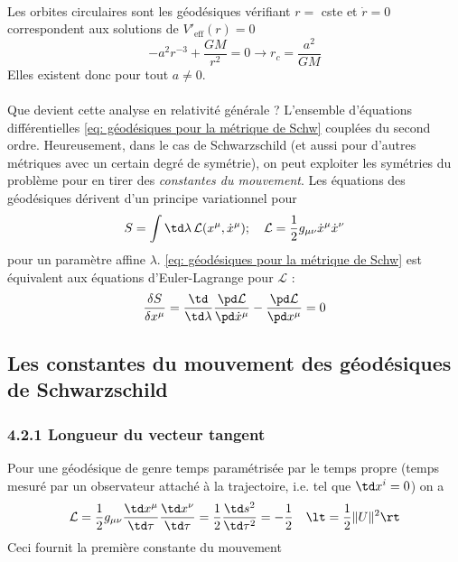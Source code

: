 \\
Les orbites circulaires sont les géodésiques vérifiant $r = $ cste et $\dot{r} = 0$ correspondent aux solutions de $V'_\text{eff}(r) = 0$
\begin{equation}
    - a^2 r^{-3} + \frac{GM}{r^2} = 0 \to r_c = \frac{a^2}{GM}
\end{equation}
Elles existent donc pour tout $a\neq 0$.\\
\\
Que devient cette analyse en relativité générale ? L'ensemble d'équations différentielles \ref{eq: géodésiques pour la métrique de Schw} couplées du second ordre. Heureusement, dans le cas de Schwarzschild (et aussi pour d'autres métriques avec un certain degré de symétrie), on peut exploiter les symétries du problème pour en tirer des \emph{constantes du mouvement}. Les équations des géodésiques dérivent d'un principe variationnel pour
\begin{equation}
    S = \int \td \lambda \, \mathcal{L}(x^\mu,\dot{x}^\mu); \quad \mathcal{L} = \frac{1}{2} g_{\mu\nu} \dot{x}^\mu \dot{x}^\nu
\end{equation}
pour un paramètre affine $\lambda$. \ref{eq: géodésiques pour la métrique de Schw} est équivalent aux équations d'Euler-Lagrange pour $\mathcal{L}$ :
\begin{equation}
    \frac{\delta S}{\delta x^\mu} = \frac{\td}{\td \lambda} \frac{\pd \mathcal{L}}{\pd \dot{x}^\mu} - \frac{\pd \mathcal{L}}{\pd x^\mu} = 0
\end{equation}
\subsection{Les constantes du mouvement des géodésiques de Schwarzschild}
\subsubsection{4.2.1 Longueur du vecteur tangent}
Pour une géodésique de genre temps paramétrisée par le temps propre (temps mesuré par un observateur attaché à la trajectoire, i.e. tel que $\td x^i = 0$) on a
\begin{equation}
    \mathcal{L} = \frac{1}{2} g_{\mu\nu} \frac{\td x^\mu}{\td \tau} \frac{\td x^\nu}{\td \tau} = \frac{1}{2} \frac{\td s^2}{\td \tau^2} = - \frac{1}{2} \quad \lt = \frac{1}{2} \lVert U \rVert^2 \rt
\end{equation}
Ceci fournit la première constante du mouvement
